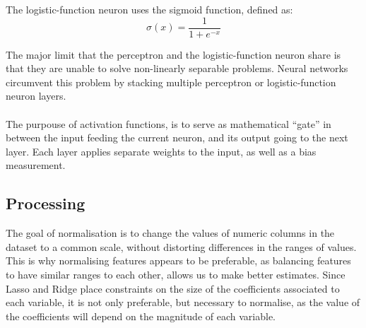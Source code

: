 \documentclass[12pt,a4paper]{article}
\begin{document}
The logistic-function neuron uses the sigmoid function, defined as:
\begin{equation*}
\sigma(x) = \dfrac{1}{1+e^{-x}}
\end{equation*}

\newpage
The major limit that the perceptron and the logistic-function neuron share is that they are unable to solve non-linearly separable problems. Neural networks circumvent this problem by stacking multiple perceptron or logistic-function neuron layers.
\\\\
The purpouse of activation functions, is to serve as mathematical “gate” in between the input feeding the current neuron, and its output going to the next layer. Each layer applies separate weights to the input, as well as a bias measurement.

\subsection*{Processing}

The goal of normalisation is to change the values of numeric columns in the dataset to a common scale, without distorting differences in the ranges of values. This is why normalising features appears to be preferable, as balancing features to have similar ranges to each other, allows us to make better estimates. Since Lasso and Ridge place constraints on the size of the coefficients associated to each variable, it is not only preferable, but necessary to normalise, as the value of the coefficients will depend on the magnitude of each variable.
\end{document}
